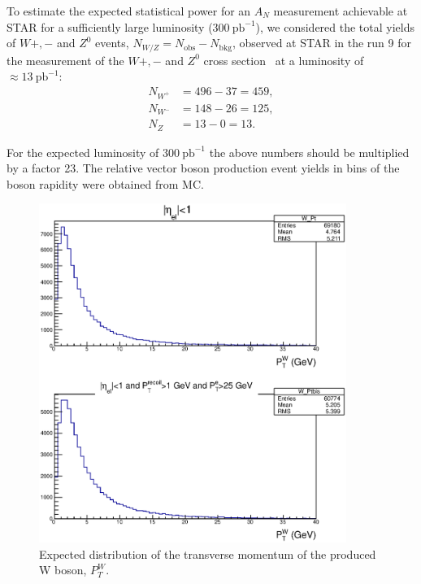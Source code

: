 \documentclass[12pt]{article}
\begin{document}
To estimate the expected statistical power for an $A_N$ measurement achievable at STAR for a sufficiently large luminosity ($300~\text{pb}^{-1}$), we considered the total yields of $W{+,-}$ and $Z^0$ events, $N_{W/Z} = N_\text{obs} -
N_\text{bkg}$, observed at STAR in the run 9 for the measurement of the $W{+,-}$ and $Z^0$ cross section~\cite{WCrossSecRun9} at a luminosity of $\approx 13~\text{pb}^{-1}$:
%
\begin{align*}
N_{W^+} &= 496 - 37 = 459,\\
N_{W^-} &= 148 - 26 = 125,\\
N_Z &= 13 - 0 = 13.
\end{align*}
%

For the expected luminosity of $300~\text{pb}^{-1}$ the above numbers should be
multiplied by a factor 23. The relative vector boson production event yields in bins of the boson rapidity were
obtained from MC. 

\begin{figure}[tbhp]
\begin{center}
\includegraphics[width=10cm]{images/W_Pt.eps}
\end{center}
\caption{\label{fig:MC_W_Pt} Expected distribution of the transverse momentum of the produced W boson, $P^W_T$.}
\end{figure}
\end{document}
